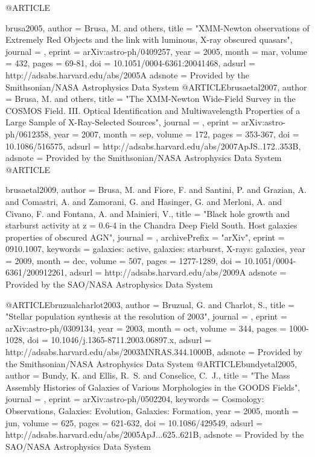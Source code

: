 {{{{{{{{{{@ARTICLE{brusa2005,
   author = {{Brusa}, M. and others},
    title = "{XMM-Newton observations of Extremely Red Objects and the link with luminous, X-ray obscured quasars}",
  journal = {\aap},
   eprint = {arXiv:astro-ph/0409257},
     year = 2005,
    month = mar,
   volume = 432,
    pages = {69-81},
      doi = {10.1051/0004-6361:20041468},
   adsurl = {http://adsabs.harvard.edu/abs/2005A%
  adsnote = {Provided by the Smithsonian/NASA Astrophysics Data System}
}
@ARTICLE{brusaetal2007,
   author = {{Brusa}, M. and others},
    title = "{The XMM-Newton Wide-Field Survey in the COSMOS Field. III. Optical Identification and Multiwavelength Properties of a Large Sample of X-Ray-Selected Sources}",
  journal = {\apjs},
   eprint = {arXiv:astro-ph/0612358},
     year = 2007,
    month = sep,
   volume = 172,
    pages = {353-367},
      doi = {10.1086/516575},
   adsurl = {http://adsabs.harvard.edu/abs/2007ApJS..172..353B},
  adsnote = {Provided by the Smithsonian/NASA Astrophysics Data System}
}
@ARTICLE{brusaetal2009,
   author = {{Brusa}, M. and {Fiore}, F. and {Santini}, P. and {Grazian}, A. and 
	{Comastri}, A. and {Zamorani}, G. and {Hasinger}, G. and {Merloni}, A. and 
	{Civano}, F. and {Fontana}, A. and {Mainieri}, V.},
    title = "{Black hole growth and starburst activity at z = 0.6-4 in the Chandra Deep Field South. Host galaxies properties of obscured AGN}",
  journal = {\aap},
archivePrefix = "arXiv",
   eprint = {0910.1007},
 keywords = {galaxies: active, galaxies: starburst, X-rays: galaxies},
     year = 2009,
    month = dec,
   volume = 507,
    pages = {1277-1289},
      doi = {10.1051/0004-6361/200912261},
   adsurl = {http://adsabs.harvard.edu/abs/2009A%
  adsnote = {Provided by the SAO/NASA Astrophysics Data System}
}



@ARTICLE{bruzualcharlot2003,
   author = {{Bruzual}, G. and {Charlot}, S.},
    title = "{Stellar population synthesis at the resolution of 2003}",
  journal = {\mnras},
   eprint = {arXiv:astro-ph/0309134},
     year = 2003,
    month = oct,
   volume = 344,
    pages = {1000-1028},
      doi = {10.1046/j.1365-8711.2003.06897.x},
   adsurl = {http://adsabs.harvard.edu/abs/2003MNRAS.344.1000B},
  adsnote = {Provided by the Smithsonian/NASA Astrophysics Data System}
}
@ARTICLE{bundyetal2005,
   author = {{Bundy}, K. and {Ellis}, R.~S. and {Conselice}, C.~J.},
    title = "{The Mass Assembly Histories of Galaxies of Various Morphologies in the GOODS Fields}",
  journal = {\apj},
   eprint = {arXiv:astro-ph/0502204},
 keywords = {Cosmology: Observations, Galaxies: Evolution, Galaxies: Formation},
     year = 2005,
    month = jun,
   volume = 625,
    pages = {621-632},
      doi = {10.1086/429549},
   adsurl = {http://adsabs.harvard.edu/abs/2005ApJ...625..621B},
  adsnote = {Provided by the SAO/NASA Astrophysics Data System}
}


}}}}}}}}}}}}
